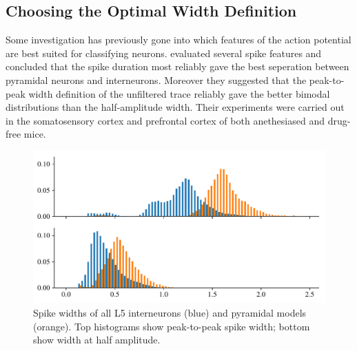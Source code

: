 \documentclass[altfont, fleqn]{uiophd}
\begin{document}
\subsection{Choosing the Optimal Width Definition}
\label{sec:optimal_width_def}

Some investigation has previously gone into which features of 
the action potential 
are best suited
for classifying neurons. 
\Textcite{bartho_characterization_2004}
evaluated several spike features and 
concluded that
the spike duration most reliably gave the best seperation between pyramidal neurons and
interneurons. 
Moreover they suggested that the peak-to-peak width definition
of the unfiltered trace reliably gave the better bimodal distributions
than the half-amplitude width. 
Their experiments were carried out in
the somatosensory cortex and prefrontal cortex of both anethesiased
and drug-free mice.
\newline

\begin{figure}[h]
    \begin{center}
        \includegraphics[width=\textwidth]{images/sec_4/int_pyr_width_I_II.pdf}
        \caption{
            Spike widths of all L5 interneurons (blue) and pyramidal models 
            (orange).
            Top histograms show peak-to-peak spike width; bottom show 
            width at half amplitude.
        }
        \label{fig:4_width_I_II_histograms}
    \end{center}
\end{figure}
\end{document}
